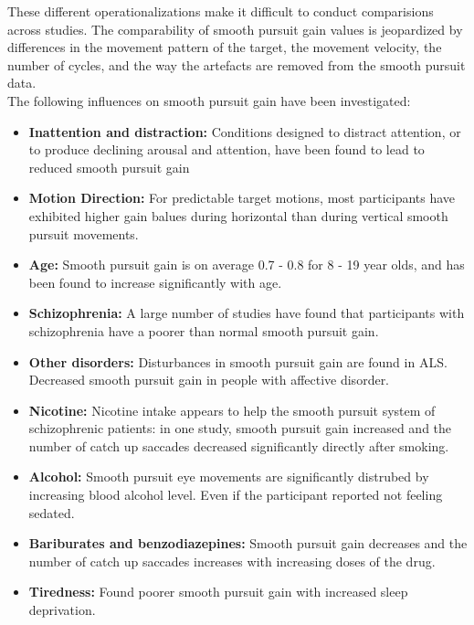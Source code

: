 \documentclass[12pt]{article}
\theoremstyle{definition}
\begin{document}
These different operationalizations make it difficult to conduct comparisions across studies. The comparability of smooth pursuit gain values is jeopardized by differences in the movement pattern of the target, the movement velocity, the number of cycles, and the way the artefacts are removed from the smooth pursuit data.\\

The following influences on smooth pursuit gain have been investigated:

\begin{itemize}
\item \textbf{Inattention and distraction:} Conditions designed to distract attention, or to produce declining arousal and attention, have been found to lead to reduced smooth pursuit gain

\item \textbf{Motion Direction:} For predictable target motions, most participants have exhibited higher gain balues during horizontal than during vertical smooth pursuit movements.

\item \textbf{Age:} Smooth pursuit gain is on average 0.7 - 0.8 for 8 - 19 year olds, and has been found to increase significantly with age.

\item \textbf{Schizophrenia:} A large number of studies have found that participants with schizophrenia have a poorer than normal smooth pursuit gain.

\item \textbf{Other disorders:} Disturbances in smooth pursuit gain are found in ALS. Decreased smooth pursuit gain in people with affective disorder.

\item \textbf{Nicotine:} Nicotine intake appears to help the smooth pursuit system of schizophrenic patients: in one study, smooth pursuit gain increased and the number of catch up saccades decreased significantly directly after smoking.

\item \textbf{Alcohol:} Smooth pursuit eye movements are significantly distrubed by increasing blood alcohol level. Even if the participant reported not feeling sedated.

\item \textbf{Bariburates and benzodiazepines:} Smooth pursuit gain decreases and the number of catch up saccades increases with increasing doses of the drug.

\item \textbf{Tiredness:} Found poorer smooth pursuit gain with increased sleep deprivation.

\end{itemize}
\end{document}
